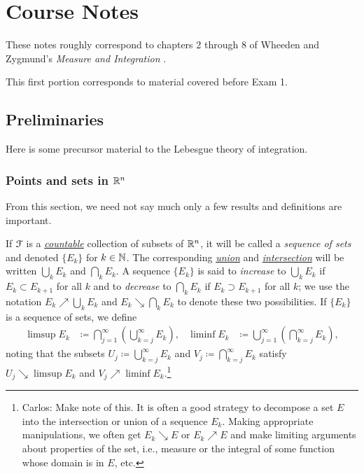 \chapter{Course Notes}
\thispagestyle{empty}
These notes roughly correspond to chapters 2 through 8 of Wheeden and
Zygmund's \emph{Measure and Integration}
\cite{wheeden-zygmund:measure-and-integral}.

This first portion corresponds to material covered before Exam 1.
\section{Preliminaries}
Here is some precursor material to the Lebesgue theory of integration.
\subsection{Points and sets in $\mathbb{R}^n$}
From this section, we need not say much only a few results and definitions
are important.

\bigskip

If $\mathcal{F}$ is a
\href{https://en.wikipedia.org/wiki/Countable}{\emph{countable}} collection
of subsets of $\mathbb{R}^n$, it will be called a \emph{sequence of sets} and
denoted $\{E_k\}$ for $k\in\mathbb{N}$. The corresponding
\href{https://en.wikipedia.org/wiki/Union_(set_theory)}{\emph{union}} and
\href{https://en.wikipedia.org/wiki/Intersection_(set_theory)}{\emph{intersection}}
will be written $\bigcup_k E_k$ and $\bigcap_k E_k$. A sequence $\{E_k\}$
is said to \emph{increase} to $\bigcup_k E_k$ if $E_k\subset E_{k+1}$ for
all $k$ and to \emph{decrease} to $\bigcap_k E_k$ if $E_k\supset E_{k+1}$
for all $k$; we use the notation $E_k\nearrow \bigcup_k E_k$ and
$E_k\searrow\bigcap_k E_k$ to denote these two possibilities. If $\{E_k\}$
is a sequence of sets, we define
\begin{equation}
\label{eq:1:set-limsup-liminf}
\begin{aligned}
\limsup E_k
&\coloneqq\bigcap_{j=1}^\infty\left(\bigcup_{k=j}^\infty E_k\right),&
\liminf E_k&\coloneqq\bigcup_{j=1}^\infty\left(\bigcap_{k=j}^\infty E_k\right),
\end{aligned}
\end{equation}
noting that the subsets $U_j\coloneqq\bigcup_{k=j}^\infty E_k$ and
$V_j\coloneqq\bigcap_{k=j}^\infty E_k$ satisfy $U_j\searrow\limsup E_k$ and
$V_j\nearrow\liminf E_k$.\footnote{Carlos: Make note of this. It is often a
good strategy to decompose a set $E$ into the intersection or union of a
sequence $E_k$. Making appropriate manipulations, we often get $E_k\searrow
E$ or $E_k\nearrow E$ and make limiting arguments about properties of the
set, i.e., measure or the integral of some function whose domain is in $E$,
etc.}
